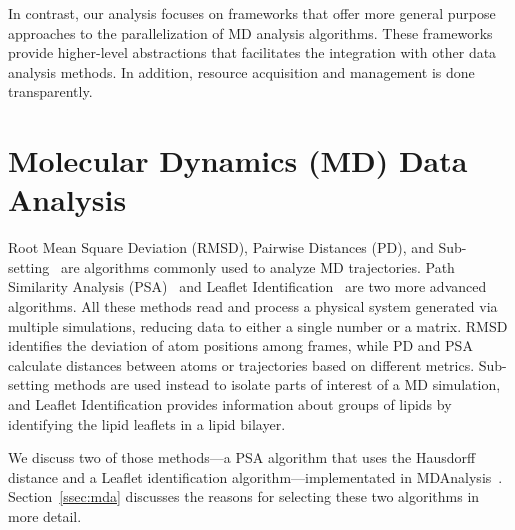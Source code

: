 In contrast, our analysis focuses on frameworks that offer more general purpose approaches to the
parallelization of MD analysis algorithms.
These frameworks provide higher-level abstractions that facilitates the
integration with other data analysis methods. In addition, resource acquisition
and management is done transparently.

\section{Molecular Dynamics (MD) Data Analysis}
\label{sec:md_use_cases}

Root Mean Square Deviation (RMSD), Pairwise Distances (PD), and
Sub-setting~\cite{mura2014biomolecules} are algorithms commonly used to analyze
MD trajectories. Path Similarity Analysis (PSA)~\cite{seyler2015path} and
Leaflet Identification~\cite{michaud2011mdanalysis} are two more advanced
algorithms. All these methods read and process a physical system generated via
multiple simulations, reducing data to either a single number or a matrix. RMSD
identifies the deviation of atom positions among frames, while PD and PSA
calculate distances between atoms or trajectories based on different metrics.
Sub-setting methods are used instead to isolate parts of interest of a MD
simulation, and Leaflet Identification provides information about groups of
lipids by identifying the lipid leaflets in a lipid bilayer.

We discuss two of those methods---a PSA algorithm that uses the Hausdorff
distance and a Leaflet identification algorithm---implementated in
MDAnalysis~\cite{michaud2011mdanalysis,gowers2016mdanalysis}.
Section~\ref{ssec:mda} discusses the reasons for selecting these two algorithms
in more detail.



